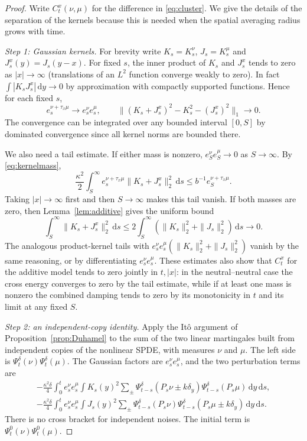 \documentclass[11pt]{article}
\numberwithin{equation}{section}
\theoremstyle{definition}
\theoremstyle{remark}
\newcommand{\dd}{\,\mathrm d}
\begin{document}
\begin{proof}
Write $C_t^x(\nu,\mu)$ for the difference in \eqref{eq:cluster}. We give the details of the separation of the kernels because this is needed when the spatial averaging radius grows with time.

\emph{Step 1: Gaussian kernels.} For brevity write $K_s=K_s^\nu$, $J_s=K_s^\mu$ and $J_s^x(y)=J_s(y-x)$. For fixed $s$, the inner product of $K_s$ and $J_s^x$ tends to zero as $|x|\to\infty$ (translations of an $L^2$ function converge weakly to zero). In fact $\int|K_sJ_s^x|\dd y\to0$ by approximation with compactly supported functions. Hence for each fixed $s$,
\[
 e_s^{\nu+\tau_x\mu}\longrightarrow e_s^\nu e_s^\mu,
 \qquad \|(K_s+J_s^x)^2-K_s^2-(J_s^x)^2\|_1\longrightarrow0.
\]
The convergence can be integrated over any bounded interval $[0,S]$ by dominated convergence since all kernel norms are bounded there.

We also need a tail estimate. If either mass is nonzero, $e_S^\nu e_S^\mu\to0$ as $S\to\infty$. By \eqref{eq:kernelmass},
\[
 \frac{\kappa^2}{2}\int_S^\infty e_s^{\nu+\tau_x\mu}\|K_s+J_s^x\|_2^2\dd s
 \le b^{-1} e_S^{\nu+\tau_x\mu}.
\]
Taking $|x|\to\infty$ first and then $S\to\infty$ makes this tail vanish. If both masses are zero, then Lemma~\ref{lem:additive} gives the uniform bound
\[
 \int_S^\infty\|K_s+J_s^x\|_2^2\dd s
 \le 2\int_S^\infty(\|K_s\|_2^2+\|J_s\|_2^2)\dd s\longrightarrow0.
\]
The analogous product-kernel tails with $e_s^\nu e_s^\mu(\|K_s\|_2^2+\|J_s\|_2^2)$ vanish by the same reasoning, or by differentiating $e_s^\nu e_s^\mu$. These estimates also show that $C_t^x$ for the additive model tends to zero jointly in $t,|x|$: in the neutral--neutral case the cross energy converges to zero by the tail estimate, while if at least one mass is nonzero the combined damping tends to zero by its monotonicity in $t$ and its limit at any fixed $S$.

\emph{Step 2: an independent-copy identity.} Apply the It\^o argument of Proposition~\ref{prop:Duhamel} to the sum of the two linear martingales built from independent copies of the nonlinear SPDE, with measures $\nu$ and $\mu$. The left side is $\Psi_t^\delta(\nu)\Psi_t^\delta(\mu)$. The Gaussian factors are $e_s^\nu e_s^\mu$, and the two perturbation terms are
\begin{align*}
 -\frac{\kappa^2\delta}{4}\int_0^t e_s^\nu e_s^\mu\int K_s(y)^2
 \sum_{\pm}\Psi_{t-s}^\delta(P_s\nu\pm k\delta_y)\Psi_{t-s}^\delta(P_s\mu)\dd y\dd s,\\
 -\frac{\kappa^2\delta}{4}\int_0^t e_s^\nu e_s^\mu\int J_s(y)^2
 \sum_{\pm}\Psi_{t-s}^\delta(P_s\nu)\Psi_{t-s}^\delta(P_s\mu\pm k\delta_y)\dd y\dd s.
\end{align*}
There is no cross bracket for independent noises. The initial term is $\Psi_t^0(\nu)\Psi_t^0(\mu)$.


\end{proof}
\end{document}
